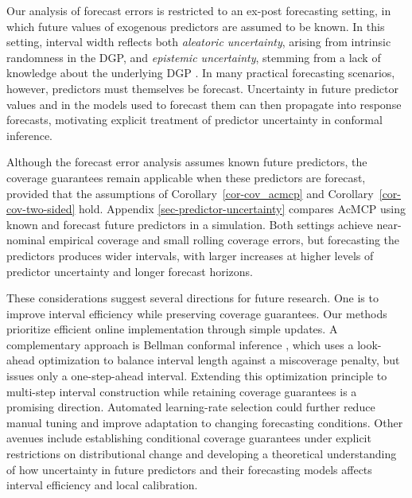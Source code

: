 \documentclass[
  american,
  12pt]{article}
\theoremstyle{plain}
\theoremstyle{plain}
\theoremstyle{remark}
\begin{document}
Our analysis of forecast errors is restricted to an ex-post forecasting
setting, in which future values of exogenous predictors are assumed to
be known. In this setting, interval width reflects both \emph{aleatoric
uncertainty}, arising from intrinsic randomness in the DGP, and
\emph{epistemic uncertainty}, stemming from a lack of knowledge about
the underlying DGP \citep{sale2025}. In many practical forecasting
scenarios, however, predictors must themselves be forecast. Uncertainty
in future predictor values and in the models used to forecast them can
then propagate into response forecasts, motivating explicit treatment of
predictor uncertainty in conformal inference.

Although the forecast error analysis assumes known future predictors,
the coverage guarantees remain applicable when these predictors are
forecast, provided that the assumptions of Corollary~\ref{cor-cov_acmcp}
and Corollary~\ref{cor-cov-two-sided} hold. Appendix
\ref{sec-predictor-uncertainty} compares AcMCP using known and forecast
future predictors in a simulation. Both settings achieve near-nominal
empirical coverage and small rolling coverage errors, but forecasting
the predictors produces wider intervals, with larger increases at higher
levels of predictor uncertainty and longer forecast horizons.

These considerations suggest several directions for future research. One
is to improve interval efficiency while preserving coverage guarantees.
Our methods prioritize efficient online implementation through simple
updates. A complementary approach is Bellman conformal inference
\citep{yang2024ts}, which uses a look-ahead optimization to balance
interval length against a miscoverage penalty, but issues only a
one-step-ahead interval. Extending this optimization principle to
multi-step interval construction while retaining coverage guarantees is
a promising direction. Automated learning-rate selection could further
reduce manual tuning and improve adaptation to changing forecasting
conditions. Other avenues include establishing conditional coverage
guarantees under explicit restrictions on distributional change and
developing a theoretical understanding of how uncertainty in future
predictors and their forecasting models affects interval efficiency and
local calibration.

\appendix
\setcounter{section}{0}
\renewcommand{\thesection}{Appendix \Alph{section}}
\renewcommand{\thesubsection}{\Alph{section}.\arabic{subsection}}
\end{document}
